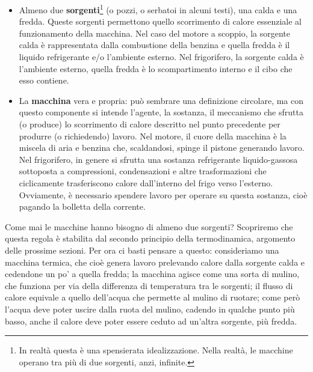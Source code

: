\begin{itemize}
    \item Almeno due \textbf{sorgenti}\footnote{In realtà questa è una
    spensierata idealizzazione. Nella realtà, le macchine
    operano tra più di due sorgenti, anzi, infinite.} (o pozzi, o serbatoi in alcuni
    testi), una calda e una fredda. Queste sorgenti
    permettono quello scorrimento di calore essenziale al
    funzionamento della macchina. Nel caso
    del motore a scoppio, la sorgente calda è rappresentata dalla
    combustione della benzina e quella fredda è il
    liquido refrigerante e/o l'ambiente esterno. Nel
    frigorifero, la sorgente calda è l'ambiente esterno,
    quella fredda è lo scompartimento interno e il
    cibo che esso contiene.

    \item La \textbf{macchina} vera e propria: può sembrare
    una definizione circolare, ma con questo componente
    si intende l'agente, la sostanza, il meccanismo
    che sfrutta (o produce) lo scorrimento di
    calore descritto nel punto precedente per
    produrre (o richiedendo) lavoro. Nel motore,
    il cuore della macchina è la miscela di aria
    e benzina che, scaldandosi, spinge il pistone
    generando lavoro. Nel frigorifero, in genere si
    sfrutta una sostanza refrigerante liquido-gassosa
    sottoposta a compressioni, condensazioni e altre
    trasformazioni che ciclicamente trasferiscono
    calore dall'interno del frigo verso l'esterno.
    Ovviamente, è necessario spendere lavoro per
    operare su questa sostanza, cioè pagando la
    bolletta della corrente.
\end{itemize}

Come mai le macchine hanno bisogno di almeno due sorgenti?
Scopriremo che questa regola è stabilita dal secondo principio
della termodinamica, argomento delle prossime sezioni.
Per ora ci basti pensare a questo:
consideriamo una macchina termica, che cioè genera lavoro
prelevando calore dalla sorgente calda e cedendone un po' a
quella fredda; la macchina agisce come
una sorta di mulino, che funziona per via della differenza
di temperatura tra le sorgenti; il flusso di calore equivale
a quello dell'acqua che permette al mulino di ruotare; come
però l'acqua deve poter uscire dalla ruota del mulino, cadendo
in qualche punto più basso, anche
il calore deve poter essere ceduto ad un'altra sorgente, più
fredda.

